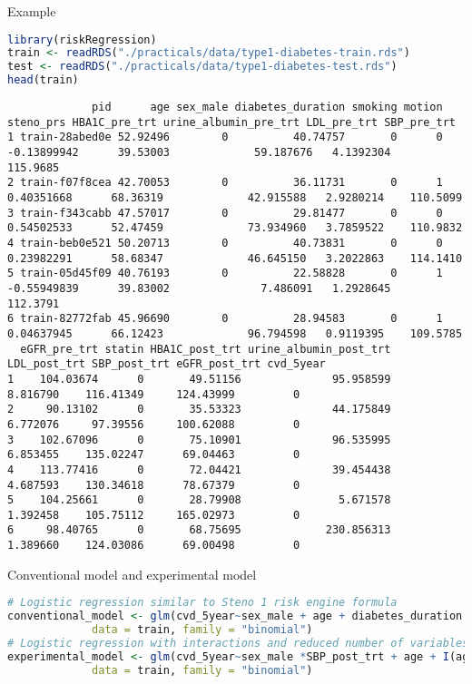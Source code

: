 \documentclass{beamer}\usepackage{listings}
\begin{document}
\begin{frame}[label={sec:org5611efe},fragile,shrink=25]{Example}
 \begin{lstlisting}[language=r,numbers=none,otherkeywords={}, deletekeywords={}]
library(riskRegression)
train <- readRDS("./practicals/data/type1-diabetes-train.rds")
test <- readRDS("./practicals/data/type1-diabetes-test.rds")
head(train)
\end{lstlisting}
\pause
{}
\label{}
\begin{verbatim}
             pid      age sex_male diabetes_duration smoking motion   steno_prs HBA1C_pre_trt urine_albumin_pre_trt LDL_pre_trt SBP_pre_trt
1 train-28abed0e 52.92496        0          40.74757       0      0 -0.13899942      39.53003             59.187676   4.1392304    115.9685
2 train-f07f8cea 42.70053        0          36.11731       0      1  0.40351668      68.36319             42.915588   2.9280214    110.5099
3 train-f343cabb 47.57017        0          29.81477       0      0  0.54502533      52.47459             73.934960   3.7859522    110.9832
4 train-beb0e521 50.20713        0          40.73831       0      0  0.23982291      58.68347             46.645150   3.2022863    114.1410
5 train-05d45f09 40.76193        0          22.58828       0      1 -0.55949839      39.83002              7.486091   1.2928645    112.3791
6 train-82772fab 45.96690        0          28.94583       0      1  0.04637945      66.12423             96.794598   0.9119395    109.5785
  eGFR_pre_trt statin HBA1C_post_trt urine_albumin_post_trt LDL_post_trt SBP_post_trt eGFR_post_trt cvd_5year
1    104.03674      0       49.51156              95.958599     8.816790    116.41349     124.43999         0
2     90.13102      0       35.53323              44.175849     6.772076     97.39556     100.62088         0
3    102.67096      0       75.10901              96.535995     6.853455    135.02247      69.04463         0
4    113.77416      0       72.04421              39.454438     4.687593    130.34618      78.67379         0
5    104.25661      0       28.79908               5.671578     1.392458    105.75112     165.02973         0
6     98.40765      0       68.75695             230.856313     1.389660    124.03086      69.00498         0
\end{verbatim}
\end{frame}
\begin{frame}[label={sec:orgfd9b974},fragile]{Conventional model and experimental model}
 \begin{lstlisting}[language=r,numbers=none,otherkeywords={}, deletekeywords={model}]
# Logistic regression similar to Steno 1 risk engine formula
conventional_model <- glm(cvd_5year~sex_male + age + diabetes_duration + smoking + motion + HBA1C_post_trt + urine_albumin_post_trt + LDL_post_trt + SBP_post_trt + eGFR_post_trt,
             data = train, family = "binomial")
# Logistic regression with interactions and reduced number of variables
experimental_model <- glm(cvd_5year~sex_male *SBP_post_trt + age + I(age>40) * eGFR_post_trt + diabetes_duration + smoking + motion,
             data = train, family = "binomial")
\end{lstlisting}
\end{frame}
\end{document}
